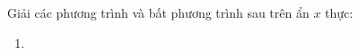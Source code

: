 \exercise Giải các phương trình và bất phương trình sau trên ẩn $x$ thực:

\begin{multicols}{2}
   \begin{enumerate}
      \item 
   \end{enumerate}
\end{multicols}

\solution

